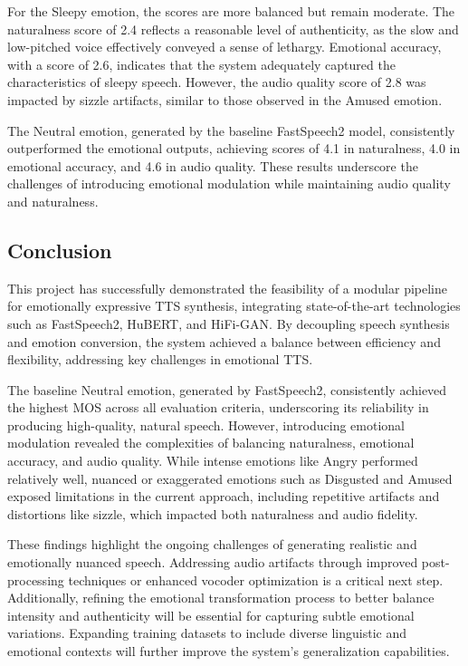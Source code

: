 For the Sleepy emotion, the scores are more balanced but remain moderate. The naturalness score of 2.4 reflects a reasonable level of authenticity, as the slow and low-pitched voice effectively conveyed a sense of lethargy. Emotional accuracy, with a score of 2.6, indicates that the system adequately captured the characteristics of sleepy speech. However, the audio quality score of 2.8 was impacted by sizzle artifacts, similar to those observed in the Amused emotion.

The Neutral emotion, generated by the baseline FastSpeech2 model, consistently outperformed the emotional outputs, achieving scores of 4.1 in naturalness, 4.0 in emotional accuracy, and 4.6 in audio quality. These results underscore the challenges of introducing emotional modulation while maintaining audio quality and naturalness.

\subsection{Conclusion}

This project has successfully demonstrated the feasibility of a modular pipeline for emotionally expressive TTS synthesis, integrating state-of-the-art technologies such as FastSpeech2, HuBERT, and HiFi-GAN. By decoupling speech synthesis and emotion conversion, the system achieved a balance between efficiency and flexibility, addressing key challenges in emotional TTS.

The baseline Neutral emotion, generated by FastSpeech2, consistently achieved the highest MOS across all evaluation criteria, underscoring its reliability in producing high-quality, natural speech. However, introducing emotional modulation revealed the complexities of balancing naturalness, emotional accuracy, and audio quality. While intense emotions like Angry performed relatively well, nuanced or exaggerated emotions such as Disgusted and Amused exposed limitations in the current approach, including repetitive artifacts and distortions like sizzle, which impacted both naturalness and audio fidelity.

These findings highlight the ongoing challenges of generating realistic and emotionally nuanced speech. Addressing audio artifacts through improved post-processing techniques or enhanced vocoder optimization is a critical next step. Additionally, refining the emotional transformation process to better balance intensity and authenticity will be essential for capturing subtle emotional variations. Expanding training datasets to include diverse linguistic and emotional contexts will further improve the system’s generalization capabilities.

